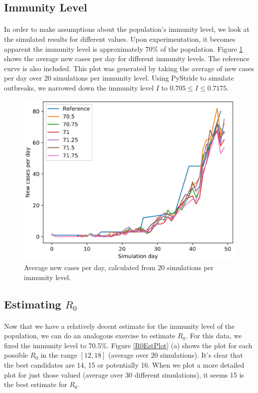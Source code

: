 \documentclass[runningheads]{llncs}
\begin{document}
\subsection{Immunity Level}

\paragraph{} In order to make assumptions about the population's immunity level, we look at the simulated results for different values. Upon experimentation, it becomes apparent the immunity level is approximately 70\% of the population. Figure \ref{immLvlPlot} shows the average new cases per day for different immunity levels. The reference curve is also included. This plot was generated by taking the average of new cases per day over 20 simulations per immunity level. Using PyStride to simulate outbreaks, we narrowed down the immunity level $I$ to \( 0.705 \leq I \leq 0.7175 \).

\begin{figure}[H]
\includegraphics[width=\textwidth]{ImmLvl.eps}
\caption{Average new cases per day, calculated from 20 simulations per immunity level.} 
\label{immLvlPlot}
\end{figure}


\subsection{Estimating $R_{0}$}

\paragraph{} Now that we have a relatively decent estimate for the immunity level of the population, we can do an analogous exercise to estimate $R_0$. For this data, we fixed the immunity level to 70.5\%. Figure \ref{R0EstPlot} (a) shows the plot for each possible $R_0$ in the range $[12, 18]$ (average over 20 simulations). It's clear that the best candidates are 14, 15 or potentially 16. When we plot a more detailed plot for just those valued (average over 30 different simulations), it seems 15 is the best estimate for $R_0$.
\end{document}
